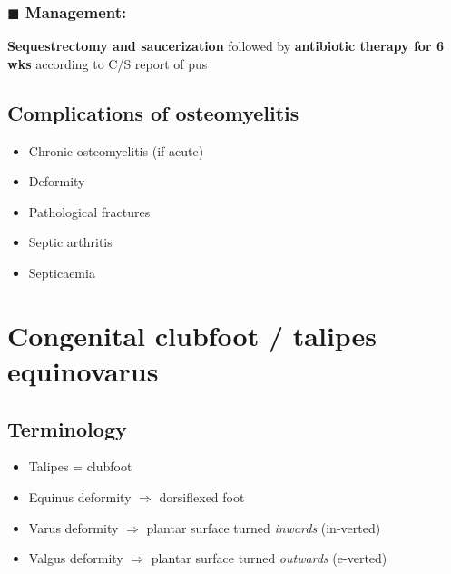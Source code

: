 \documentclass[
  12pt,
]{memoir}
\providecommand{\tightlist}{%
  \setlength{\itemsep}{0pt}\setlength{\parskip}{0pt}}
\begin{document}
\hypertarget{blacksquare-management}{%
\subsubsection{\texorpdfstring{\(\blacksquare\)
Management:}{\textbackslash blacksquare Management:}}\label{blacksquare-management}}

\textbf{Sequestrectomy and saucerization} followed by \textbf{antibiotic
therapy for 6 wks} according to C/S report of pus

\hypertarget{complications-of-osteomyelitis}{%
\subsection{Complications of
osteomyelitis}\label{complications-of-osteomyelitis}}

\begin{itemize}
\tightlist
\item
  Chronic osteomyelitis (if acute)
\item
  Deformity
\item
  Pathological fractures
\item
  Septic arthritis
\item
  Septicaemia
\end{itemize}

\pagebreak

\hypertarget{congenital-clubfoot-talipes-equinovarus}{%
\section{Congenital clubfoot / talipes
equinovarus}\label{congenital-clubfoot-talipes-equinovarus}}

\hypertarget{terminology}{%
\subsection{Terminology}\label{terminology}}

\begin{itemize}
\tightlist
\item
  Talipes = clubfoot
\item
  Equinus deformity \(\Rightarrow\) dorsiflexed foot
\item
  Varus deformity \(\Rightarrow\) plantar surface turned \emph{inwards}
  (in-verted)
\item
  Valgus deformity \(\Rightarrow\) plantar surface turned
  \emph{outwards} (e-verted)
\end{itemize}
\end{document}
